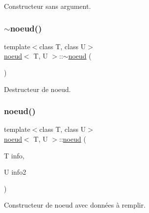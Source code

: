 Constructeur sans argument. 

\mbox{\label{classnoeud_a75bb30950411d77e2cf47b97eb575e96}} 
\subsubsection{\texorpdfstring{$\sim$noeud()}{~noeud()}}
{\footnotesize\ttfamily template$<$class T, class U$>$ \\
\hyperlink{classnoeud}{noeud}$<$ T, U $>$\+::$\sim$\hyperlink{classnoeud}{noeud} (\begin{DoxyParamCaption}{ }\end{DoxyParamCaption})\hspace{0.3cm}{\ttfamily [inline]}}



Destructeur de noeud. 

\mbox{\label{classnoeud_a70ef2fae1a2b747fd5520220073f142a}} 
\subsubsection{\texorpdfstring{noeud()}{noeud()}\hspace{0.1cm}{\footnotesize\ttfamily [2/3]}}
{\footnotesize\ttfamily template$<$class T, class U$>$ \\
\hyperlink{classnoeud}{noeud}$<$ T, U $>$\+::\hyperlink{classnoeud}{noeud} (\begin{DoxyParamCaption}\item[{T}]{info,  }\item[{U}]{info2 }\end{DoxyParamCaption})\hspace{0.3cm}{\ttfamily [inline]}}



Constructeur de noeud avec données à remplir. 

\mbox{\label{classnoeud_af0e9231a1505f8ca9e563d728e830f30}} 
